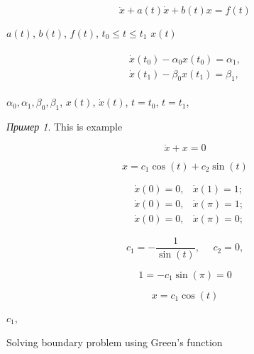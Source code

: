 \documentclass{article}
\theoremstyle{plain} \newtheorem*{theorem*}{Теорема}
\theoremstyle{plain} \newtheorem{theorem}{Теорема}[section]
\theoremstyle{definition} \newtheorem*{corollary*}{Следствие}
\theoremstyle{definition} \newtheorem{corollary}{Следствие}[section]
\theoremstyle{remark} \newtheorem*{example*}{Пример}
\begin{document}
\abovedisplayskip=0pt
\belowdisplayskip=9pt
\abovedisplayshortskip=0pt
\belowdisplayshortskip=12pt


\begin{equation}
    \ddot{x} + a(t)\dot{x} + b(t)x = f(t)
\end{equation}

$a(t)$, $b(t)$, $f(t)$, $t_0 \le t \le t_1$
$x(t)$

\begin{gather}
    \begin{split}
        \dot{x}(t_0) - \alpha_0 x(t_0) = \alpha_1, \\
        \dot{x}(t_1) - \beta_0 x(t_1) = \beta_1,
    \end{split}
\end{gather}

$\alpha_0, \alpha_1, \beta_0, \beta_1$,
$x(t)$, $\dot{x}(t)$, $t = t_0$, $t = t_1$,

\begin{example*}
    This is example

    \begin{equation}
        \ddot{x} + x = 0
    \end{equation}

    \begin{equation}
        x = c_1 \cos(t) + c_2 \sin(t)
    \end{equation}

    \begin{align}
        &\dot{x}(0) = 0, &\dot{x}(1) = 1; \\
        &\dot{x}(0) = 0, &\dot{x}(\pi) = 1; \\
        &\dot{x}(0) = 0, &\dot{x}(\pi) = 0;
    \end{align}

    \begin{equation*}
        c_1 = - \frac{1}{\sin(t)}, \ \ \ \ \ \
        c_2 = 0,
    \end{equation*}

    \begin{equation*}
        1 = -c_1 \sin(\pi) = 0
    \end{equation*}

    \begin{equation*}
        x = c_1 \cos(t)
    \end{equation*}

    $c_1$,

\end{example*}

Solving boundary problem using Green's function
\end{document}
